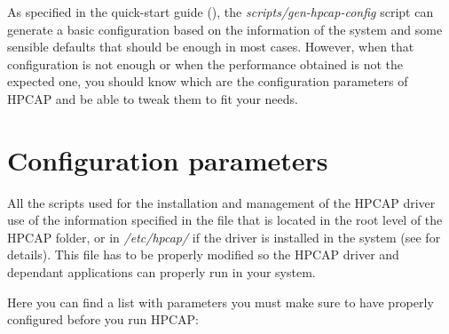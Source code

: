 \documentclass[a4paper,oneside]{hpman}
\begin{document}
As specified in the quick-start guide (), the \textit{scripts/gen-hpcap-config} script can generate a basic configuration based on the information of the system and some sensible defaults that should be enough in most cases. However, when that configuration is not enough or when the performance obtained is not the expected one, you should know which are the configuration parameters of HPCAP and be able to tweak them to fit your needs.

\section{Configuration parameters}
\label{sec:Params}

All the scripts used for the installation and management of the HPCAP driver use of the information specified in the  file that is located in the root level of the HPCAP folder, or in \textit{/etc/hpcap/} if the driver is installed in the system (see  for details). This file has to be properly modified so the HPCAP driver and dependant applications can properly run in your system.

Here you can find a list with parameters you must make sure to have properly configured before you run HPCAP:
\end{document}
